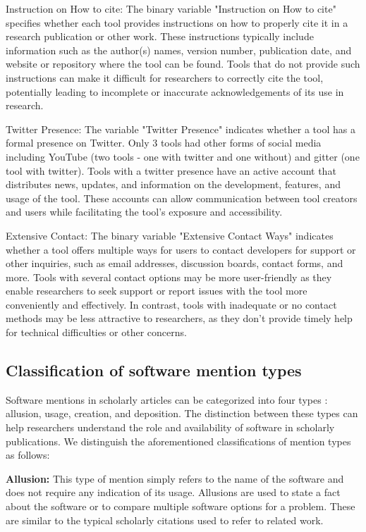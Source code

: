 \documentclass{article}
\begin{document}
Instruction on How to cite: The binary variable "Instruction on How to cite" specifies whether each tool provides instructions on how to properly cite it in a research publication or other work. These instructions typically include information such as the author(s) names, version number, publication date, and website or repository where the tool can be found. Tools that do not provide such instructions can make it difficult for researchers to correctly cite the tool, potentially leading to incomplete or inaccurate acknowledgements of its use in research.

Twitter Presence: The variable "Twitter Presence" indicates whether a tool has a formal presence on Twitter. Only 3 tools had other forms of social media including YouTube (two tools - one with twitter and one without) and gitter (one tool with twitter). Tools with a twitter presence have an active account that distributes news, updates, and information on the development, features, and usage of the tool. These accounts can allow communication between tool creators and users while facilitating the tool's exposure and accessibility.

Extensive Contact: The binary variable "Extensive Contact Ways" indicates whether a tool offers multiple ways for users to contact developers for support or other inquiries, such as email addresses, discussion boards, contact forms, and more. Tools with several contact options may be more user-friendly as they enable researchers to seek support or report issues with the tool more conveniently and effectively. In contrast, tools with inadequate or no contact methods may be less attractive to researchers, as they don't provide timely help for technical difficulties or other concerns.


\subsection{Classification of software mention types}


Software mentions in scholarly articles can be categorized into four types \cite{schindler_annotation_2019, schindler_somesci-_2021}: allusion, usage, creation, and deposition. The distinction between these types can help researchers understand the role and availability of software in scholarly publications. We distinguish the aforementioned classifications of mention types as follows:
 
\textbf{Allusion:} This type of mention simply refers to the name of the software and does not require any indication of its usage. Allusions are used to state a fact about the software or to compare multiple software options for a problem. These are similar to the typical scholarly citations used to refer to related work.
 
\end{document}
